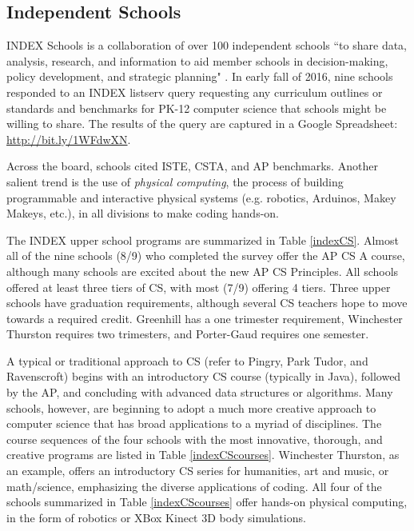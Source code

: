 \subsection{Independent Schools}
 \label{index}
INDEX Schools is a collaboration of over 100 independent schools ``to share data, analysis, research, and information to aid member schools in decision-making, policy development, and strategic planning" \cite{index}. In early fall of 2016, nine schools responded to an INDEX listserv query requesting any curriculum outlines or standards and benchmarks for PK-12 computer science that schools might be willing to share. The results of the query are captured in a Google Spreadsheet: \href{http://bit.ly/1WFdwXN}{http://bit.ly/1WFdwXN}. \par 
Across the board, schools cited ISTE, CSTA, and AP benchmarks. Another salient trend is the use of \textit{physical computing}, the process of building programmable and interactive physical systems (e.g. robotics, Arduinos, Makey Makeys, etc.), in all divisions to make coding hands-on.   \par
The INDEX upper school programs are summarized in Table \ref{indexCS}. Almost all of the nine schools (8/9) who completed the survey offer the AP CS A course, although many schools are excited about the new AP CS Principles. All schools offered at least three tiers of CS, with most (7/9) offering 4 tiers. Three upper schools have graduation requirements, although several CS teachers hope to move towards a required credit. Greenhill has a one trimester requirement, Winchester Thurston requires two trimesters, and Porter-Gaud requires one semester. \par
A typical or traditional approach to CS (refer to Pingry, Park Tudor, and Ravenscroft) begins with an introductory CS course (typically in Java), followed by the AP, and concluding with advanced data structures or algorithms. Many schools, however, are beginning to adopt a much more creative approach to computer science that has broad applications to a myriad of disciplines. The course sequences of the four schools with the most innovative, thorough, and creative programs are listed in Table \ref{indexCScourses}. Winchester Thurston, as an example, offers an introductory CS series for humanities, art and music, or math/science, emphasizing the diverse applications of coding. All four of the schools summarized in Table \ref{indexCScourses} offer hands-on physical computing, in the form of robotics or XBox Kinect 3D body simulations. \par

